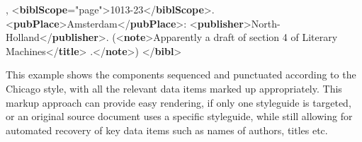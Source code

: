 \begin{shaded}
\hspace*{1em}\mbox{}\newline 
{},\mbox{}\newline 
{<\textbf{biblScope}\hspace*{1em}{unit}="{page}">}1013-23{</\textbf{biblScope}>}.\mbox{}\newline 
{<\textbf{pubPlace}>}Amsterdam{</\textbf{pubPlace}>}: {<\textbf{publisher}>}North-\mbox{}\newline 
\hspace*{1em}\hspace*{1em} Holland{</\textbf{publisher}>}. ({<\textbf{note}>}Apparently a draft of section 4 of\mbox{}\newline 
{}\mbox{}\newline 
\hspace*{1em}\hspace*{1em}Literary\mbox{}\newline 
\hspace*{1em}\hspace*{1em}\hspace*{1em}\hspace*{1em}\hspace*{1em}\hspace*{1em} Machines{</\textbf{title}>}\mbox{}\newline 
\hspace*{1em}.{</\textbf{note}>})\mbox{}\newline 
\mbox{}\newline 
{</\textbf{bibl}>}\end{shaded}\egroup\par \noindent  This example shows the components sequenced and punctuated according to the Chicago style, with all the relevant data items marked up appropriately. This markup approach can provide easy rendering, if only one styleguide is targeted, or an original source document uses a specific styleguide, while still allowing for automated recovery of key data items such as names of authors, titles etc.
